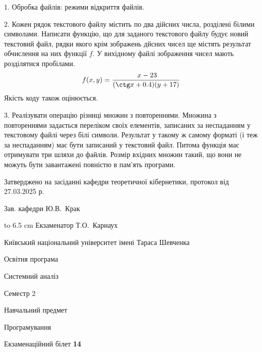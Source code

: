 \documentclass[12pt, ukrainian]{article}
\begin{document}
{%
1. Обробка файлів: режими відкриття файлів.%
\par
\vspace{2mm}

2. Кожен рядок текстового файлу містить по два дійсних числа, розділені білими символами.
Написати функцію, що для заданого текстового файлу будує новий текстовий файл, рядки якого крім зображень дйсних чисел ще містять результат обчислення на них функції $f$. У вихідному файлі зображення чисел мають розділятися пробілами. 
$$f(x, y) =\frac{\ x - 23}{(\ctg x + 0.4) (y + 17)}$$ 
Якість коду також оцінюється.

\par
\vspace{2mm}

3. Реалізувати операцію різниці множин з повтореннями. Множина з повтореннями задається переліком своїх елементів, записаних за неспаданням у текстовому файлі через білі символи. Результат у такому ж самому форматі (і теж за неспаданням) має бути записаний у текстовий файл. Питома функція має отримувати три шляхи до файлів. Розмір вхідних множин такий, що вони не можуть бути завантажені повністю в пам’ять програми.

}
{\smallskip\smallskip \begin {scriptsize} Затверджено на засіданні кафедри теоретичної кібернетики, протокол   від   27.03.2025 р.\par\smallskip\smallskip\smallskip\smallskip
{\parbox {6.5 cm} {Зав. кафедри \dotfill Ю.В.~Крак}}\hspace {0.7cm} {\hbox to 6.5 cm { Екзаменатор \dotfill Т.О.~Карнаух}} \end{scriptsize}}
\vspace{2.9cm}
{{\begin {scriptsize}\par
{ \center  Київський національний університет імені Тараса Шевченка \par}
{\parbox {5 cm}{Освітня програма \hfill}{\parbox {7 cm}{Системний аналіз\hfill}}\parbox {6 cm}{\hfill Семестр 2}}\par
{\parbox {5 cm} {Навчальний предмет \hfill}\parbox {7 cm}{Програмування \hfill}\parbox {6cm}{\hfill}\par}\vspace{-15pt} \end{scriptsize}}{\center Екзаменаційний білет \No \textbf { 14 }\par}}
\end{document}

